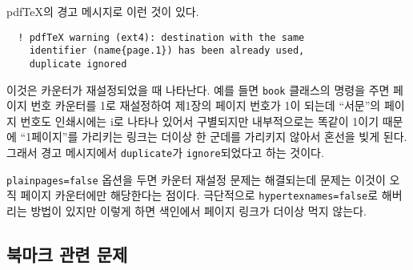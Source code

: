 pdf\TeX{}의 경고 메시지로 이런 것이 있다.
\begin{verbatim}
  ! pdfTeX warning (ext4): destination with the same
    identifier (name{page.1}) has been already used,
    duplicate ignored
\end{verbatim}
이것은 카운터가 재설정되었을 때 나타난다. 예를 들면 \texttt{book} 클래스의  명령을 주면 페이지 번호 카운터를 1로 재설정하여 제1장의 페이지 번호가 1이 되는데 ``서문''의 페이지 번호도 인쇄시에는 i로 나타나 있어서 구별되지만 내부적으로는 똑같이 1이기 때문에 ``1페이지''를 가리키는 링크는 더이상 한 군데를 가리키지 않아서 혼선을 빚게 된다. 그래서 경고 메시지에서 \verb|duplicate|가 \verb|ignore|되었다고 하는 것이다.

\texttt{plainpages=false} 옵션을 두면 카운터 재설정 문제는 해결되는데 문제는 이것이 오직 페이지 카운터에만 해당한다는 점이다. 극단적으로 \texttt{hypertexnames=false}로 해버리는 방법이 있지만 이렇게 하면 색인에서 페이지 링크가 더이상 먹지 않는다.

\subsection{북마크 관련 문제}

